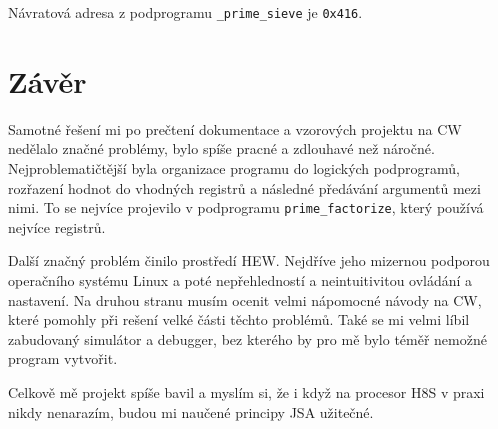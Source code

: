 \documentclass[12pt]{article}
\newcommand{\code}[1]{\mbox{\texttt{#1}}}
\begin{document}
Návratová adresa z podprogramu \code{\_prime\_sieve} je \code{0x416}.


\section{Závěr}

Samotné řešení mi po prečtení dokumentace a vzorových projektu na CW nedělalo značné problémy, bylo
spíše pracné a zdlouhavé než náročné. Nejproblematičtější byla organizace programu do logických
podprogramů, rozřazení hodnot do vhodných registrů a následné předávání argumentů mezi nimi. To se
nejvíce projevilo v podprogramu \code{prime\_factorize}, který používá nejvíce registrů.

Další značný problém činilo prostředí HEW. Nejdříve jeho mizernou podporou operačního systému Linux
a poté nepřehledností a neintuitivitou ovládání a nastavení. Na druhou stranu musím ocenit velmi
nápomocné návody na CW, které pomohly při rešení velké části těchto problémů. Také se mi velmi
líbil zabudovaný simulátor a debugger, bez kterého by pro mě bylo téměř nemožné program vytvořit.

Celkově mě projekt spíše bavil a myslím si, že i když na procesor H8S v praxi nikdy nenarazím,
budou mi naučené principy JSA užitečné.
\end{document}
